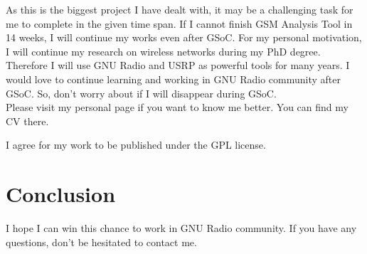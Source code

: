 \documentclass[a4paper,12pt,oneside]{article}
\begin{document}
As this is the biggest project I have dealt with, it may be a challenging task for me to complete in the given time span. If I cannot finish GSM Analysis Tool in 14 weeks, I will continue my works even after GSoC. For my personal motivation, I will continue my research on wireless networks during my PhD degree. Therefore I will use GNU Radio and USRP as powerful tools for many years. I would love to continue learning and working in GNU Radio community after GSoC. So, don't worry about if I will disappear during GSoC.\\

Please visit my personal page {} if you want to know me better. You can find my CV there.

I agree for my work to be published under the GPL license.

\section{Conclusion}
I hope I can win this chance to work in GNU Radio community. If you have any questions, don't be hesitated to contact me.

\end{document}
